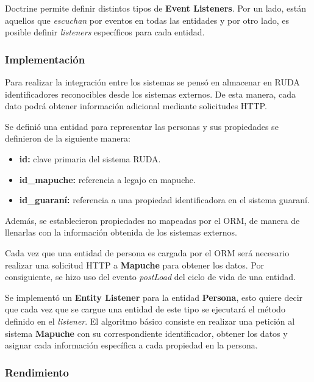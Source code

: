 Doctrine permite definir distintos tipos de \textbf{Event Listeners}. Por un lado, están aquellos que \textit{escuchan} por eventos en todas las entidades y por otro lado, es posible definir
\textit{listeners} específicos para cada entidad.

\subsubsection{Implementación}%
\label{ssub:implementación}


Para realizar la integración entre los sistemas se pensó en almacenar en RUDA identificadores reconocibles desde los sistemas externos\@. De esta manera,
cada dato podrá obtener información adicional mediante solicitudes HTTP\@.

Se definió una entidad para representar las personas y sus propiedades se definieron de la siguiente manera:

\begin{itemize}
    \item \textbf{id:} clave primaria del sistema RUDA\@.
    \item \textbf{id\_mapuche:} referencia a legajo en mapuche\@.
    \item \textbf{id\_guaraní:} referencia a una propiedad identificadora en el sistema guaraní\@.
\end{itemize}

Además, se establecieron propiedades no mapeadas por el ORM, de manera de llenarlas con la información obtenida de los sistemas externos.

Cada vez que una entidad de persona es cargada por el ORM será necesario realizar una solicitud HTTP a \textbf{Mapuche} para obtener los datos\@. Por consiguiente, se hizo uso del evento \textit{postLoad}
del ciclo de vida de una entidad.


Se implementó un \textbf{Entity Listener} para la entidad \textbf{Persona}, esto quiere decir que cada vez que se cargue una entidad de este tipo se ejecutará el método definido en el \textit{listener}\@.
El algoritmo básico consiste en realizar una petición al sistema \textbf{Mapuche} con su correspondiente identificador, obtener los datos y asignar cada información específica a cada propiedad en la
persona.


\subsubsection{Rendimiento}%
\label{ssub:rendimiento}

